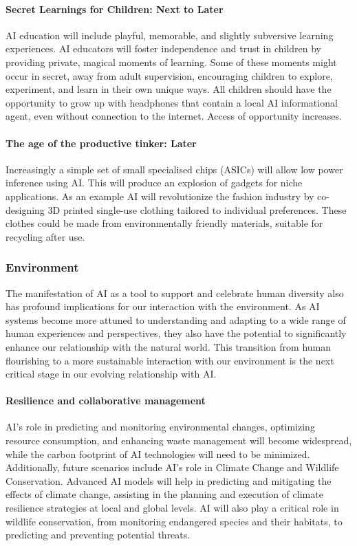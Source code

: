 \paragraph{Secret Learnings for Children: Next to Later} \par
AI education will include playful, memorable, and slightly subversive learning experiences. AI educators will foster independence and trust in children by providing private, magical moments of learning. Some of these moments might occur in secret, away from adult supervision, encouraging children to explore, experiment, and learn in their own unique ways. All children should have the opportunity to grow up with headphones that contain a local AI informational agent, even without connection to the internet. Access of opportunity increases.
\paragraph{The age of the productive tinker: Later}\par
Increasingly a simple set of small specialised chips (ASICs) will allow low power inference using AI. This will produce an explosion of gadgets for niche applications. As an example AI will revolutionize the fashion industry by co-designing 3D printed single-use clothing tailored to individual preferences. These clothes could be made from environmentally friendly materials, suitable for recycling after use.
\subsubsection{Environment}
The manifestation of AI as a tool to support and celebrate human diversity also has profound implications for our interaction with the environment. As AI systems become more attuned to understanding and adapting to a wide range of human experiences and perspectives, they also have the potential to significantly enhance our relationship with the natural world. This transition from human flourishing to a more sustainable interaction with our environment is the next critical stage in our evolving relationship with AI.
\paragraph{Resilience and collaborative management} 
AI's role in predicting and monitoring environmental changes, optimizing resource consumption, and enhancing waste management will become widespread, while the carbon footprint of AI technologies will need to be minimized. Additionally, future scenarios include AI's role in Climate Change and Wildlife Conservation. Advanced AI models will help in predicting and mitigating the effects of climate change, assisting in the planning and execution of climate resilience strategies at local and global levels. AI will also play a critical role in wildlife conservation, from monitoring endangered species and their habitats, to predicting and preventing potential threats. 

